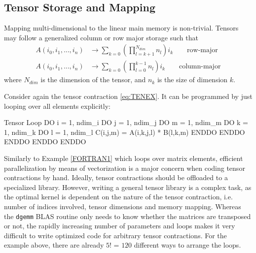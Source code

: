 \subsection{Tensor Storage and Mapping \label{sec:tenstor}}

Mapping multi-dimensional to the linear main memory is non-trivial. Tensors may follow a generalized column or row major storage such that
\begin{align}
A(i_0,i_1,...,i_n) &\rightarrow \sum_{k=0} \left( \prod_{l=k+1}^{N_{dim}} n_l \right) i_k \qquad \textrm{row-major} \\
A(i_0,i_1,...,i_n) &\rightarrow \sum_{k=0} \left( \prod_{l=0}^{k-1} n_l \right) i_k \qquad \textrm{column-major} 
\end{align} 
\noindent where $N_{dim}$ is the dimension of the tensor, and $n_k$ is the size of dimension $k$.

Consider again the tensor contraction \ref{eq:TENEX}. It can be programmed by just looping over all elements explicitly:
\begin{fortran}{Tensor Loop \label{lst:TLOOP}}
DO i = 1, ndim_i
  DO j = 1, ndim_j
    DO m = 1, ndim_m
      DO k = 1, ndim_k
        DO l = 1, ndim_l
          C(i,j,m) = A(i,k,j,l) * B(l,k,m)
        ENDDO
      ENDDO
    ENDDO
  ENDDO
ENDDO
\end{fortran}
\noindent Similarly to Example \ref{FORTRAN1} which loops over matrix elements, efficient parallelization by means of vectorization is a major concern when coding tensor contractions by hand. Ideally, tensor contractions should be offloaded to a specialized library. However, writing a general tensor library is a complex task, as the optimal kernel is dependent on the nature of the tensor contraction, i.e. number of indices involved, tensor dimensions and memory mapping. Whereas the \texttt{dgemm} BLAS routine only needs to know whether the matrices are transposed or not, the rapidly increasing number of parameters and loops makes it very difficult to write optimized code for arbitrary tensor contractions. For the example above, there are already $5!$ = $120$ different ways to arrange the loops.  


